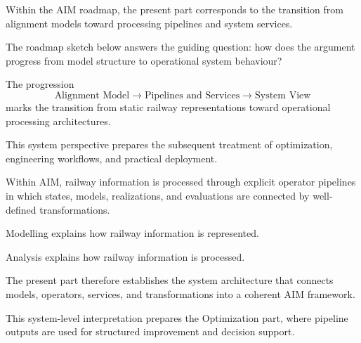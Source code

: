 Within the AIM roadmap, the present part corresponds to the transition
from alignment models toward processing pipelines and system services.

The roadmap sketch below answers the guiding question: how does the
argument progress from model structure to operational system behaviour?

\begin{center}
\end{center}

The progression
\[
\text{Alignment Model}
\rightarrow
\text{Pipelines and Services}
\rightarrow
\text{System View}
\]
marks the transition from static railway representations toward
operational processing architectures.

This system perspective prepares the subsequent treatment of
optimization, engineering workflows, and practical deployment.

\begin{principle}
\label{princ:pipeline-principle}
Within AIM, railway information is processed through explicit operator
pipelines in which states, models, realizations, and evaluations are
connected by well-defined transformations.
\end{principle}

\begin{summary}
Modelling explains how railway information is represented.

Analysis explains how railway information is processed.

The present part therefore establishes the system architecture that
connects models, operators, services, and transformations into a
coherent AIM framework.
\end{summary}

This system-level interpretation prepares the Optimization part, where
pipeline outputs are used for structured improvement and decision
support.

